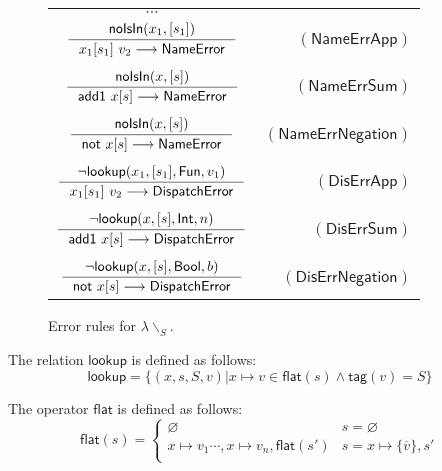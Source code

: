 \documentclass[preprint,authoryear,sort&compress,9pt,nocopyrightspace]{article}
\newcommand\rulename[1]{\mathsf{(#1)}}
\newcommand{\tto}{\longrightarrow}
\newcommand{\negacion}[1]{\mathsf{not} \ #1}
\newcommand{\suma}[1]{\mathsf{add1} \ #1}
\newcommand{\lab}{\mathsf{tag}}
\newcommand{\boolt}{\mathsf{Bool}}
\newcommand{\intt}{\mathsf{Int}}
\newcommand{\funt}{\mathsf{Fun}}
\newcommand{\noisin}{\mathsf{noIsIn}}
\newcommand{\buscar}{\mathsf{lookup}}
\newcommand{\nameerror}{\mathsf{NameError}}
\newcommand{\dispatcherror}{\mathsf{DispatchError}}
\newcommand{\semanticB}{${\lambda}{\backslash}_S$}
\begin{document}
\begin{figure}[h]
\begin{small}
\begin{center}
\begin{tabular}{|c r|}
\hline
$\cdots$&\\
$\inference{ \noisin(x_1, [s_1])}{x_1[s_1] \ v_2 \tto  \nameerror}$&$\rulename{NameErrApp}$\\
&\\
$\inference{ \noisin(x, [s])}{\suma{x[s]} \tto \nameerror}$&$\rulename{NameErrSum}$\\
&\\
$\inference{ \noisin(x, [s])}{\negacion{x[s]} \tto \nameerror}$&$\rulename{NameErrNegation}$\\
&\\
$\inference{ \neg \buscar(x_1, [s_1],\funt, v_1)}{x_1[s_1] \ v_2 \tto  \dispatcherror}$&$\rulename{DisErrApp}$\\
&\\
$\inference{\neg \buscar(x, [s], \intt, n)}{\suma{x[s]} \tto \dispatcherror}$&$\rulename{DisErrSum}$\\
&\\
$\inference{\neg \buscar(x, [s], \boolt, b)}{\negacion{x[s]} \tto \dispatcherror}$&$\rulename{DisErrNegation}$\\
\hline
\end{tabular}
\caption{Error rules for \semanticB.}
\label{tabla:errorRules2}
\end{center}
\end{small}
\end{figure}

\begin{definition}[$\buscar$]
\label{definition:tcs}
\mbox{}
The relation $\buscar$ is defined  as follows:
\[ \buscar  = \{(x, s, S, v)| x \mapsto v \in \mathsf{flat}(s) \wedge \lab(v) = S\}
\]
\end{definition}

\begin{definition}
\label{definition:tcs}
\mbox{}
The operator $\mathsf{flat}$ is defined  as follows:
\[ \mathsf{flat}(s) = \begin{cases} 
      \varnothing & s =  \varnothing \\
      x \mapsto v_1 \cdots , x \mapsto v_n,\mathsf{flat} (s') & s = x \mapsto \{\overline{v}\}, s'\\
   \end{cases}
\]
\end{definition}
\end{document}
